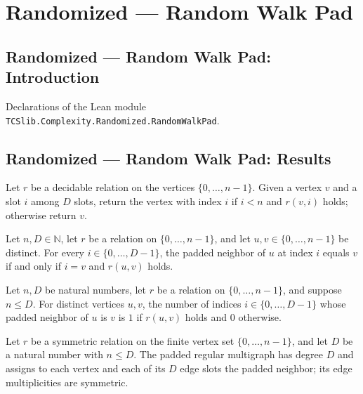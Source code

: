 \section{Randomized --- Random Walk Pad}
\subsection*{Randomized --- Random Walk Pad: Introduction}

Declarations of the Lean module \texttt{TCSlib.Complexity.Randomized.RandomWalkPad}.

\subsection*{Randomized --- Random Walk Pad: Results}

\begin{definition}
\label{Randomized.padNbr}
\leanok
Let $r$ be a decidable relation on the vertices $\{0,\ldots,n-1\}$. Given a vertex
$v$ and a slot $i$ among $D$ slots, return the vertex with index $i$ if $i<n$ and
$r(v,i)$ holds; otherwise return $v$.
\end{definition}

\begin{theorem}
\label{Randomized.padNbr_eq_iff}
\leanok
{}
Let $n,D\in\mathbb{N}$, let $r$ be a relation on $\{0,\ldots,n-1\}$, and let
$u,v\in\{0,\ldots,n-1\}$ be distinct. For every $i\in\{0,\ldots,D-1\}$, the padded
neighbor of $u$ at index $i$ equals $v$ if and only if $i=v$ and $r(u,v)$ holds.
\end{theorem}

\begin{theorem}
\label{Randomized.card_padNbr_eq}
\leanok
{}
Let $n,D$ be natural numbers, let $r$ be a relation on $\{0,\ldots,n-1\}$, and suppose
$n\le D$. For distinct vertices $u,v$, the number of indices $i\in\{0,\ldots,D-1\}$
whose padded neighbor of $u$ is $v$ is $1$ if $r(u,v)$ holds and $0$ otherwise.
\end{theorem}

\begin{definition}
\label{Randomized.padGraph}
\leanok
{}
Let $r$ be a symmetric relation on the finite vertex set $\{0,\ldots,n-1\}$, and let $D$
be a natural number with $n\le D$. The padded regular multigraph has degree $D$ and
assigns to each vertex and each of its $D$ edge slots the padded neighbor; its edge
multiplicities are symmetric.
\end{definition}

